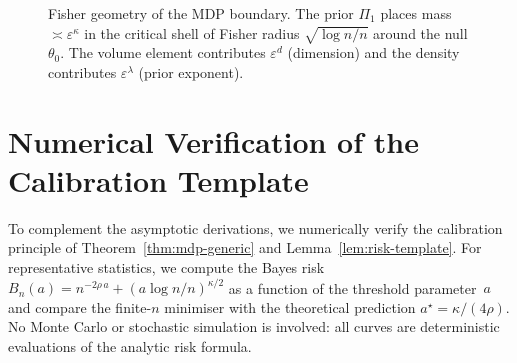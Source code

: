 \documentclass[11pt]{article}
\newcommand{\rhotail}{\rho}  %
\newcommand{\1}{\mathbf{1}}
\theoremstyle{plain}
\theoremstyle{definition}
\theoremstyle{remark}
\begin{document}
\begin{figure}[ht]
\centering
{}
\caption{Fisher geometry of the MDP boundary.  The prior $\Pi_1$ places mass $\asymp\varepsilon^{\kappa}$ in the critical shell of Fisher radius $\sqrt{\log n/n}$ around the null $\theta_0$.  The volume element contributes $\varepsilon^{d}$ (dimension) and the density contributes $\varepsilon^{\lambda}$ (prior exponent).}\label{fig:fisher-ball}
\end{figure}


\section{Numerical Verification of the Calibration Template}
\label{sec:numerics}

To complement the asymptotic derivations, we numerically verify the calibration principle of Theorem~\ref{thm:mdp-generic} and Lemma~\ref{lem:risk-template}.
For representative statistics, we compute the Bayes risk
$B_n(a)=n^{-2\rhotail\,a}+(a\log n/n)^{\kappa/2}$
as a function of the threshold parameter~$a$ and compare the finite-$n$ minimiser with the theoretical prediction $a^{\star}=\kappa/(4\rhotail)$.
No Monte Carlo or stochastic simulation is involved: all curves are deterministic evaluations of the analytic risk formula.
\end{document}
